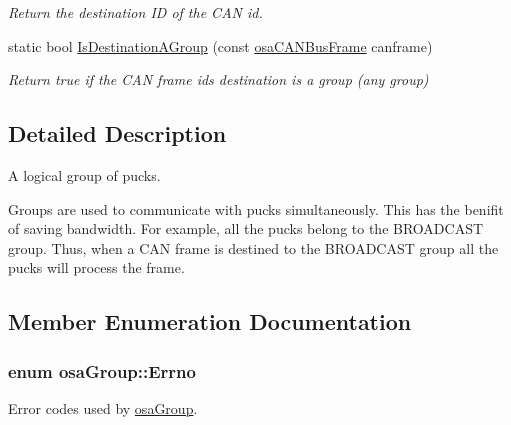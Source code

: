 \begin{DoxyCompactItemize}
\begin{DoxyCompactList}\small\item\em Return the destination I\+D of the C\+A\+N id. \end{DoxyCompactList}\item 
static bool \hyperlink{classosa_group_adb3cac1dcffb180ce07f762113e7686d}{Is\+Destination\+A\+Group} (const \hyperlink{classosa_c_a_n_bus_frame}{osa\+C\+A\+N\+Bus\+Frame} canframe)
\begin{DoxyCompactList}\small\item\em Return true if the C\+A\+N frame id\textquotesingle{}s destination is a group (any group) \end{DoxyCompactList}\end{DoxyCompactItemize}


\subsection{Detailed Description}
A logical group of pucks. 

Groups are used to communicate with pucks simultaneously. This has the benifit of saving bandwidth. For example, all the pucks belong to the B\+R\+O\+A\+D\+C\+A\+S\+T group. Thus, when a C\+A\+N frame is destined to the B\+R\+O\+A\+D\+C\+A\+S\+T group all the pucks will process the frame. 

\subsection{Member Enumeration Documentation}
\hypertarget{classosa_group_a3ac590c39198a7533838db29b01b994f}{}
\subsubsection[{Errno}]{\setlength{\rightskip}{0pt plus 5cm}enum {\bf osa\+Group\+::\+Errno}}\label{classosa_group_a3ac590c39198a7533838db29b01b994f}


Error codes used by \hyperlink{classosa_group}{osa\+Group}. 

